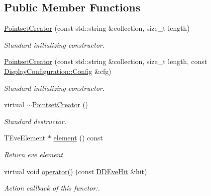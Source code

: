 \subsection*{Public Member Functions}
\begin{DoxyCompactItemize}
\item 
\hyperlink{struct_d_d4hep_1_1_pointset_creator_abe227e7b97ff9fdca5a8251994a301df}{PointsetCreator} (const std::string \&collection, size\_\-t length)
\begin{DoxyCompactList}\small\item\em Standard initializing constructor. \item\end{DoxyCompactList}\item 
\hyperlink{struct_d_d4hep_1_1_pointset_creator_af9e8ec4b156dce9ac15a0a0ee1214176}{PointsetCreator} (const std::string \&collection, size\_\-t length, const \hyperlink{class_d_d4hep_1_1_display_configuration_1_1_config}{DisplayConfiguration::Config} \&cfg)
\begin{DoxyCompactList}\small\item\em Standard initializing constructor. \item\end{DoxyCompactList}\item 
virtual \hyperlink{struct_d_d4hep_1_1_pointset_creator_a11cafd713490e23770130fa3f3c687bc}{$\sim$PointsetCreator} ()
\begin{DoxyCompactList}\small\item\em Standard destructor. \item\end{DoxyCompactList}\item 
TEveElement $\ast$ \hyperlink{struct_d_d4hep_1_1_pointset_creator_afb8fff2acc59fb5716e60901bc65ff04}{element} () const 
\begin{DoxyCompactList}\small\item\em Return eve element. \item\end{DoxyCompactList}\item 
virtual void \hyperlink{struct_d_d4hep_1_1_pointset_creator_ac17113e2952d438023d2b9d6a31d6e36}{operator()} (const \hyperlink{class_d_d4hep_1_1_d_d_eve_hit}{DDEveHit} \&hit)
\begin{DoxyCompactList}\small\item\em Action callback of this functor:. \item\end{DoxyCompactList}\end{DoxyCompactItemize}
